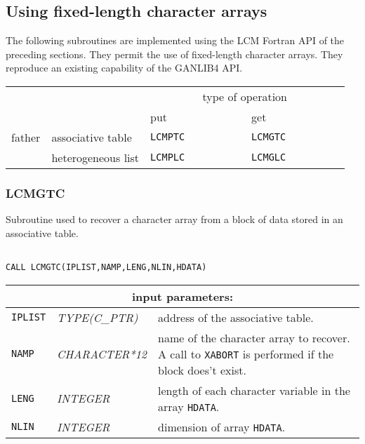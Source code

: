 \subsection{Using fixed-length character arrays}

The following subroutines are implemented using the LCM Fortran API of the preceding sections. They
permit the use of fixed-length character arrays. They reproduce an existing capability of the GANLIB4 API.

\vskip 0.4cm

\begin{center}
\begin{tabular}{|c|l|l|l|}
\cline{3-4}
\multicolumn{2}{c|}{} & \multicolumn{2}{c|}{type of operation} \\
\cline{3-4}
\multicolumn{2}{c|}{} & put~~~~~~~~~~~~~ & get~~~~~~~~~~~~~ \\
\hline
father & associative table & {\tt LCMPTC} & {\tt LCMGTC} \\
\cline{2-4}
       & heterogeneous list & {\tt LCMPLC} & {\tt LCMGLC} \\
\hline
\end{tabular}
\end{center}

\subsubsection{LCMGTC}\label{sect:LCMGTC}

Subroutine used to recover a character array from a block of data stored in an associative table.

\begin{verbatim}

CALL LCMGTC(IPLIST,NAMP,LENG,NLIN,HDATA)
\end{verbatim}

\noindent
\begin{tabular}{|p{1.5cm}|p{3cm}|p{10cm}|}
\hline
\multicolumn{3}{|c|}{\bf input parameters:} \\
\hline
{\tt IPLIST} & {\it TYPE(C\_PTR)} & address of the associative table. \\
\hline
{\tt NAMP} & {\it CHARACTER*12} &  name of the character array
to recover. A call to {\tt XABORT} is performed if the block does't exist. \\
\hline
{\tt LENG} & {\it INTEGER} & length of each character variable in the array {\tt HDATA}. \\
\hline
{\tt NLIN} & {\it INTEGER} & dimension of array {\tt HDATA}. \\
\hline
\end{tabular}

